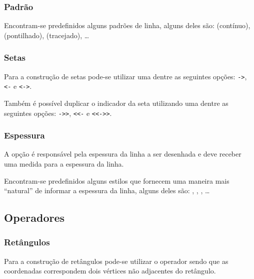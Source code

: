 \subsubsection{Padrão}
Encontram-se predefinidos alguns padrões de linha, alguns deles são:  (contínuo),  (pontilhado),  (tracejado), \ldots \\

\subsubsection{Setas}
Para a construção de setas pode-se utilizar uma dentre as seguintes opções: \lstinline!->!, \lstinline!<-! e \lstinline!<->!. \\

Também é possível duplicar o indicador da seta utilizando uma dentre as seguintes opções: \lstinline!->>!, \lstinline!<<-! e \lstinline!<<->>!. \\

\subsubsection{Espessura}
A opção  é responsável pela espessura da linha a ser desenhada e deve receber uma medida para a espessura da linha.

Encontram-se predefinidos alguns estilos que fornecem uma maneira mais ``natural'' de informar a espessura da linha, alguns deles são: , ,  , \ldots \\

\subsection{Operadores}
\subsubsection{Retângulos}
Para a construção de retângulos pode-se utilizar o operador  sendo que as coordenadas correspondem dois vértices não adjacentes do retângulo. \\

